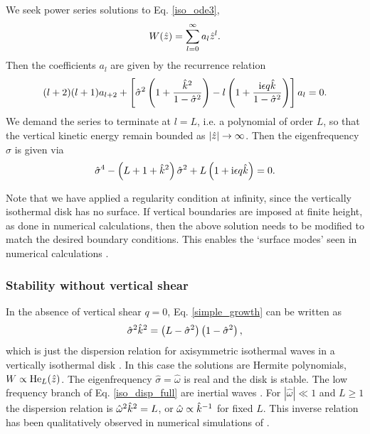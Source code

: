 
We seek power series solutions to Eq. \ref{iso_ode3}, 
\begin{align}
  W(\hat{z}) = \sum_{l=0}^\infty a_l\hat{z}^l. 
\end{align}
Then the coefficients $a_l$ are given by the recurrence relation
\begin{align}
  (l+2)(l+1)a_{l+2} +
  \left[\hat{\sigma}^2\left(1+\frac{\hat{k}^2}{1-\hat{\sigma}^2}\right)
    - l\left(1+\frac{\mathrm{i} \epsilon q
        \hat{k}}{1-\hat{\sigma}^2}\right)\right] a_l = 0. 
\end{align}
We demand the series to terminate  at $l=L$, i.e. a polynomial of
order $L$, so that the vertical kinetic energy remain bounded as 
$|\hat{z}|\to\infty$.  Then the eigenfrequency $\hat{\sigma}$ is given via 
\begin{align}
\hat{\sigma}^4 - \left(L+1+\hat{k}^2\right)\hat{\sigma}^2 + L\left(1 +
  \mathrm{i}\epsilon q \hat{k}\right) = 0. \label{simple_growth}
\end{align}

Note that we have applied a regularity condition at infinity, since
the vertically isothermal disk has no surface. If vertical boundaries
are imposed at finite height, as done in numerical calculations, then
the above solution needs to be modified to match the desired boundary
conditions. This enables the `surface modes' seen in numerical
calculations \citep{barker15}. 

\subsubsection{Stability without vertical shear}\label{stable_novshear}
In the absence of vertical shear $q=0$, Eq. \ref{simple_growth} can be
written as \begin{align}
  \hat{\sigma}^2\hat{k}^2 =
  \left(L-\hat{\sigma}^2\right)\left(1-\hat{\sigma}^2\right), \label{iso_disp_full}
\end{align}
which is just the dispersion relation for axisymmetric isothermal waves in a
vertically isothermal disk
\citep[e.g.][]{okazaki87,takeuchi98,tanaka02,zhang06,ogilvie13,barker14,barker15}. In 
this case the solutions are Hermite polynomials, $W\propto
\operatorname{He}_L(\hat{z})$.  The eigenfrequency $\hat{\sigma} = \hat{\omega}$ is real and the disk
is stable. The low frequency branch of Eq. \ref{iso_disp_full} are 
inertial waves \citep{balbus03}. For 
$|\hat{\omega}|\ll 1$ and $L\geq 1$ the dispersion relation is
$\hat{\omega}^2\hat{k}^2 = L$, or $\hat{\omega}\propto \hat{k}^{-1}$ for
fixed $L$.  This inverse relation has been qualitatively
observed in numerical simulations of \cite{stoll14}. 

